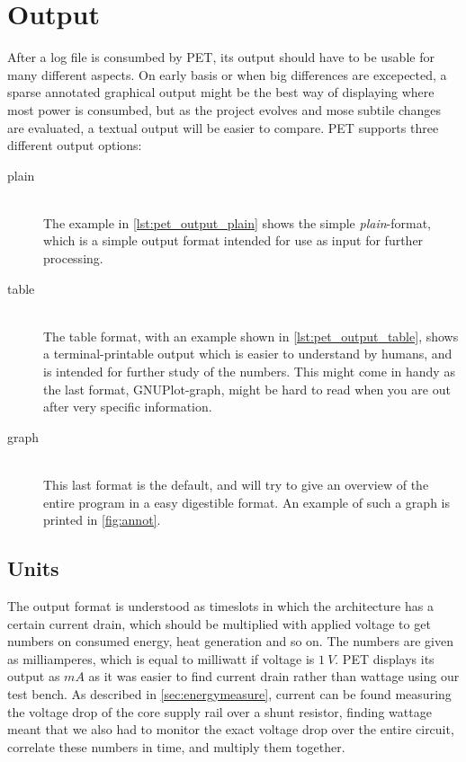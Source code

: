 \section{Output}
\label{sec:output}

After a log file is consumbed by PET, its output should have to be usable for
many different aspects. On early basis or when big differences are excepected, a
sparse annotated graphical output might be the best way of displaying where most
power is consumbed, but as the project evolves and mose subtile changes are
evaluated, a textual output will be easier to compare. PET supports three
different output options:

\begin{description}
    \item[plain]\hfill\\
        The example in \autoref{lst:pet_output_plain} shows the simple
        \emph{plain}-format, which is a simple output format intended for
        use as input for further processing.
    \item[table]\hfill\\
        The table format, with an example shown in \autoref{lst:pet_output_table},
        shows a terminal-printable output which is easier to understand by
        humans, and is intended for further study of the numbers. This might
        come in handy as the last format, GNUPlot-graph, might be hard to
        read when you are out after very specific information.
    \item[graph]\hfill\\
        This last format is the default, and will try to give an overview of
        the entire program in a easy digestible format. An example of such
        a graph is printed in \autoref{fig:annot}.
\end{description}

\subsection{Units}

The output format is understood as timeslots in which the architecture has a
certain current drain, which should be multiplied with applied voltage to get
numbers on consumed energy, heat generation and so on. The numbers are given as
milliamperes, which is equal to milliwatt if voltage is $1~V$. PET displays its
output as $mA$ as it was easier to find current drain rather than wattage using
our test bench. As described in \autoref{sec:energymeasure}, current can be
found measuring the voltage drop of the core supply rail over a shunt resistor,
finding wattage meant that we also had to monitor the exact voltage drop over
the entire circuit, correlate these numbers in time, and multiply them together.

